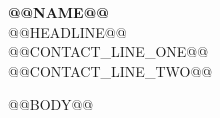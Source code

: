 \documentclass[10pt,letterpaper]{article}
\begin{document}
\begin{center}
  {\fontsize{25}{28}\selectfont\bfseries\color{Ink} @@NAME@@}\\[3pt]
  {\large\color{Teal} @@HEADLINE@@}\\[5pt]
  {\small @@CONTACT_LINE_ONE@@}\\[2pt]
  {\small @@CONTACT_LINE_TWO@@}
\end{center}
\vspace{2pt}

@@BODY@@
\end{document}

